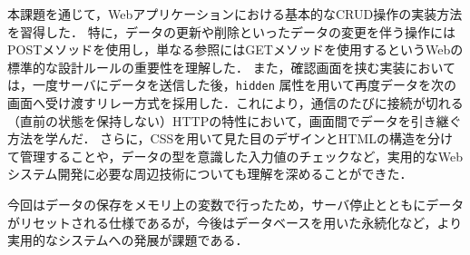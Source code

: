 本課題を通じて，Webアプリケーションにおける基本的なCRUD操作の実装方法を習得した．
特に，データの更新や削除といったデータの変更を伴う操作にはPOSTメソッドを使用し，単なる参照にはGETメソッドを使用するというWebの標準的な設計ルールの重要性を理解した．
また，確認画面を挟む実装においては，一度サーバにデータを送信した後，\texttt{hidden} 属性を用いて再度データを次の画面へ受け渡すリレー方式を採用した．これにより，通信のたびに接続が切れる（直前の状態を保持しない）HTTPの特性において，画面間でデータを引き継ぐ方法を学んだ．
さらに，CSSを用いて見た目のデザインとHTMLの構造を分けて管理することや，データの型を意識した入力値のチェックなど，実用的なWebシステム開発に必要な周辺技術についても理解を深めることができた．

今回はデータの保存をメモリ上の変数で行ったため，サーバ停止とともにデータがリセットされる仕様であるが，今後はデータベースを用いた永続化など，より実用的なシステムへの発展が課題である．